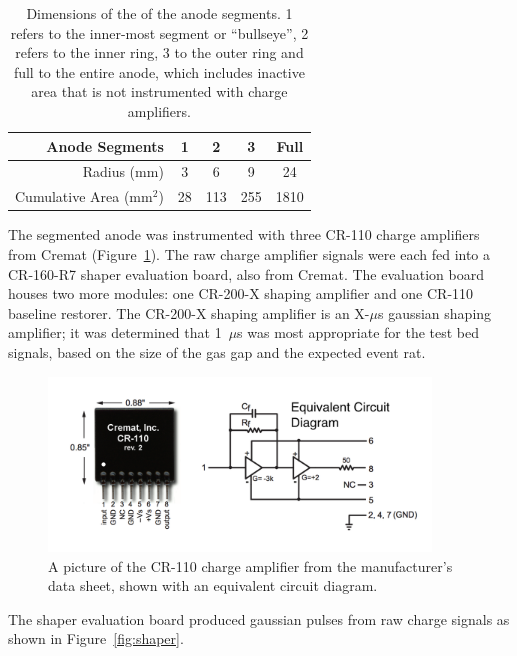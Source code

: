 \begin{table}[ht]
\centering
\begin{tabular}{rcccc}
\hline
 Anode Segments & 1 & 2 & 3 & Full \\
\hline
Radius (mm) & 3  & 6 & 9 & 24 \\
Cumulative Area (mm$^{2}$) & 28 &  113 & 255 & 1810 \\
\end{tabular}
\caption{Dimensions of the of the anode segments. 1 refers to the inner-most segment or ``bullseye'', 2 refers to the inner ring, 3 to the outer ring and full to the entire anode, which includes inactive area that is not instrumented with charge amplifiers.}
\label{T:anode_segs}
\end{table}

The segmented anode was instrumented with three CR-110 charge amplifiers from Cremat (Figure~\ref{fig:cr110}). The raw charge amplifier signals were each fed into a CR-160-R7 shaper evaluation board, also from Cremat. The evaluation board houses two more modules: one CR-200-X shaping amplifier and one CR-110 baseline restorer. The CR-200-X shaping amplifier is an X-$\mu$s gaussian shaping amplifier; it was determined that 1~$\mu$s was most appropriate for the test bed signals, based on the size of the gas gap and the expected event rat. 

\begin{figure}[htbp]
\begin{center}
\includegraphics[width=4in]{figures/testbed/cr110.png}
\caption{A picture of the CR-110 charge amplifier from the manufacturer's data sheet, shown with an equivalent circuit diagram.}
\label{fig:cr110}
\end{center}
\end{figure}

The shaper evaluation board produced gaussian pulses from raw charge signals as shown in Figure~\ref{fig:shaper}.

